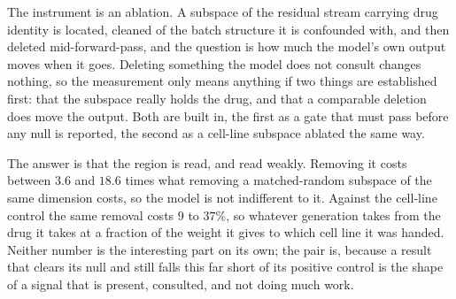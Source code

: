\noindent
The instrument is an ablation. A subspace of the residual stream carrying drug
identity is located, cleaned of the batch structure it is confounded with, and
then deleted mid-forward-pass, and the question is how much the model's own
output moves when it goes. Deleting something the model does not consult
changes nothing, so the measurement only means anything if two things are
established first: that the subspace really holds the drug, and that a
comparable deletion does move the output. Both are built in, the first as a
gate that must pass before any null is reported, the second as a cell-line
subspace ablated the same way.

The answer is that the region is read, and read weakly. Removing it costs
between $3.6$ and $18.6$ times what removing a matched-random subspace of the
same dimension costs, so the model is not indifferent to it. Against the
cell-line control the same removal costs $9$ to $37\%$, so whatever generation
takes from the drug it takes at a fraction of the weight it gives to which
cell line it was handed. Neither number is the interesting part on its own;
the pair is, because a result that clears its null and still falls this far
short of its positive control is the shape of a signal that is present,
consulted, and not doing much work.

